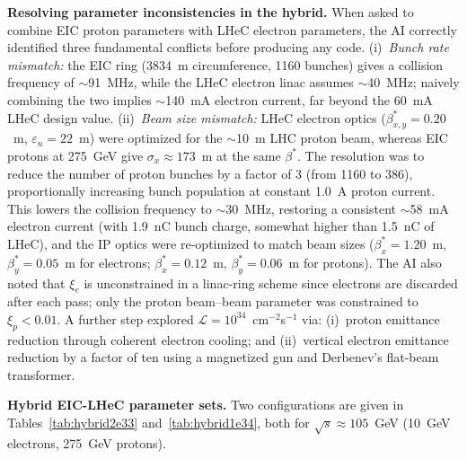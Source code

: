\documentclass[%
               refpage,       %
               biblatex,     %
               hyphens,      %
               ]{jacow}
\begin{document}
\textbf{Resolving parameter inconsistencies in the hybrid.}
When asked to combine EIC proton parameters with LHeC electron parameters, 
the AI correctly identified three fundamental conflicts before producing any 
code. (i)~\textit{Bunch rate mismatch:} the EIC ring (3834~m circumference, 
1160 bunches) gives a collision frequency of $\sim$91~MHz, while the LHeC 
electron linac assumes $\sim$40~MHz; naively combining the two implies 
$\sim$140~mA electron current, far beyond the 60~mA LHeC design value. 
(ii)~\textit{Beam size mismatch:} LHeC electron optics 
($\beta^*_{x,y}=0.20$~m, $\varepsilon_n=22$~\textmu m) were optimized for 
the $\sim$10~\textmu m LHC proton beam, whereas EIC protons at 275~GeV give 
$\sigma_x\approx173$~\textmu m at the same $\beta^*$. 
%
%
The resolution was to reduce the number of 
proton bunches by a factor of 3 (from 1160 to 386), proportionally 
increasing bunch population at constant 1.0~A proton current. This lowers 
the collision frequency to $\sim$30~MHz, restoring a consistent 
$\sim$58~mA electron current (with 1.9~nC bunch charge, somewhat higher than 1.5~nC of LHeC), and the IP optics were re-optimized to 
match beam sizes ($\beta^*_x=1.20$~m, $\beta^*_y=0.05$~m for electrons; 
$\beta^*_x=0.12$~m, $\beta^*_y=0.06$~m for protons). The AI also noted 
that $\xi_e$ is unconstrained in a linac-ring scheme since electrons are 
discarded after each pass; only the proton beam--beam parameter was 
constrained to $\xi_p < 0.01$. A further step explored 
$\mathcal{L}=10^{34}$~cm$^{-2}$s$^{-1}$ via: (i)~proton emittance 
reduction through coherent electron cooling; and (ii)~vertical electron 
emittance reduction by a factor of ten using a magnetized gun and 
Derbenev's flat-beam transformer\cite{derbenev}.

\textbf{Hybrid EIC-LHeC parameter sets.}
Two configurations are given in Tables~\ref{tab:hybrid2e33} 
and~\ref{tab:hybrid1e34}, both for $\sqrt{s}\approx105$~GeV 
(10~GeV electrons, 275~GeV protons).
\end{document}

